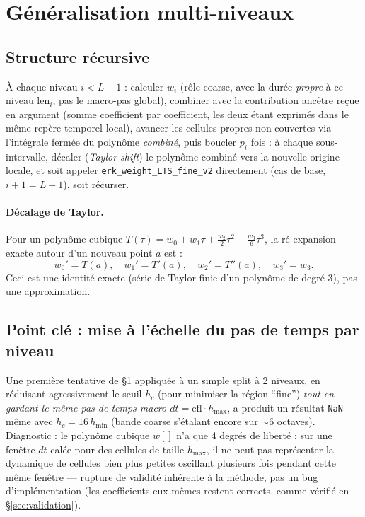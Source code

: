 \documentclass[11pt]{article}
\newcommand{\code}[1]{\texttt{#1}}
\begin{document}
\section{Généralisation multi-niveaux}
\label{sec:mlts}

\subsection{Structure récursive}

À chaque niveau $i < L-1$ : calculer $w_i$ (rôle coarse, avec la durée
\emph{propre} à ce niveau $\mathrm{len}_i$, pas le macro-pas global),
combiner avec la contribution ancêtre reçue en argument (somme
coefficient par coefficient, les deux étant exprimés dans le même repère
temporel local), avancer les cellules propres non couvertes via
l'intégrale fermée du polynôme \emph{combiné}, puis boucler $p_i$ fois :
à chaque sous-intervalle, décaler (\emph{Taylor-shift}) le polynôme
combiné vers la nouvelle origine locale, et soit appeler
\code{erk\_weight\_LTS\_fine\_v2} directement (cas de base, $i+1=L-1$),
soit récurser.

\paragraph{Décalage de Taylor.} Pour un polynôme cubique $T(\tau) = w_0 +
w_1\tau + \tfrac{w_2}{2}\tau^2 + \tfrac{w_3}{6}\tau^3$, la ré-expansion
exacte autour d'un nouveau point $a$ est :
\[
  w_0' = T(a),\quad w_1' = T'(a),\quad w_2' = T''(a),\quad w_3' = w_3.
\]
Ceci est une identité exacte (série de Taylor finie d'un polynôme de degré
3), pas une approximation.

\subsection{Point clé : mise à l'échelle du pas de temps par niveau}
\label{sec:instability}

Une première tentative de \S\ref{sec:mlts} appliquée à un simple split à
2 niveaux, en réduisant agressivement le seuil $h_c$ (pour minimiser la
région ``fine'') \emph{tout en gardant le même pas de temps macro
$dt=\mathrm{cfl}\cdot h_{\max}$}, a produit un résultat \code{NaN} ---
même avec $h_c = 16\,h_{\min}$ (bande coarse s'étalant encore sur $\sim 6$
octaves). Diagnostic : le polynôme cubique $w[]$ n'a que 4 degrés de
liberté ; sur une fenêtre $dt$ calée pour des cellules de taille
$h_{\max}$, il ne peut pas représenter la dynamique de cellules bien plus
petites oscillant plusieurs fois pendant cette même fenêtre --- rupture de
validité inhérente à la méthode, pas un bug d'implémentation (les
coefficients eux-mêmes restent corrects, comme vérifié en
\S\ref{sec:validation}).
\end{document}
